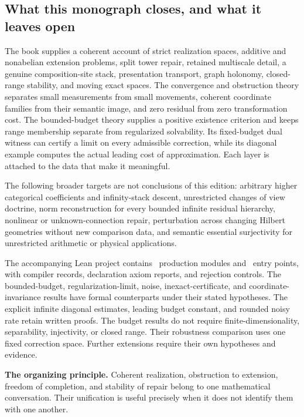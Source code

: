 \subsection{What this monograph closes, and what it leaves open}
The book supplies a coherent account of strict realization spaces, additive and nonabelian extension problems, split tower repair, retained multiscale detail, a genuine composition-site stack, presentation transport, graph holonomy, closed-range stability, and moving exact spaces. The convergence and obstruction theory separates small measurements from small movements, coherent coordinate families from their semantic image, and zero residual from zero transformation cost. The bounded-budget theory supplies a positive existence criterion and keeps range membership separate from regularized solvability. Its fixed-budget dual witness can certify a limit on every admissible correction, while its diagonal example computes the actual leading cost of approximation. Each layer is attached to the data that make it meaningful.

The following broader targets are not conclusions of this edition: arbitrary higher categorical coefficients and infinity-stack descent, unrestricted changes of view doctrine, norm reconstruction for every bounded infinite residual hierarchy, nonlinear or unknown-connection repair, perturbation across changing Hilbert geometries without new comparison data, and semantic essential surjectivity for unrestricted arithmetic or physical applications.

The accompanying Lean project contains \EditionProductionModules\ production modules and \EditionRoots\ entry points, with compiler records, declaration axiom reports, and rejection controls. The bounded-budget, regularization-limit, noise, inexact-certificate, and coordinate-invariance results have formal counterparts under their stated hypotheses. The explicit infinite diagonal estimates, leading budget constant, and rounded noisy rate retain written proofs. The budget results do not require finite-dimensionality, separability, injectivity, or closed range. Their robustness comparison uses one fixed correction space. Further extensions require their own hypotheses and evidence.

\begin{insight}
\textbf{The organizing principle.} Coherent realization, obstruction to extension, freedom of completion, and stability of repair belong to one mathematical conversation. Their unification is useful precisely when it does not identify them with one another.
\end{insight}
